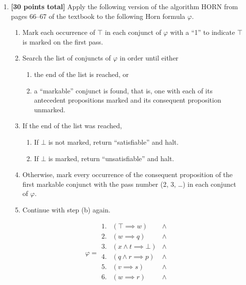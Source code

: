 \documentclass{article}
\begin{document}
\begin{enumerate}
  \vfill
  \begin{center}
    (continued overleaf)
  \end{center}
  \newpage
  
\item \textbf{[30 points total]} Apply the following version of the
  algorithm HORN from pages 66--67 of the textbook to the following
  Horn formula $\varphi$.
  \begin{enumerate}
  \item Mark each occurrence of $\top$ in each conjunct of $\varphi$
    with a ``1'' to indicate $\top$ is marked on the first pass.
  \item Search the list of conjuncts of $\varphi$ in order until
    either
    \begin{enumerate}
    \item the end of the list is reached, or
    \item a ``markable'' conjunct is found, that is, one with each of
      its antecedent propositions marked and its consequent
      proposition unmarked.
    \end{enumerate}
  \item If the end of the list was reached,
    \begin{enumerate}
    \item If $\bot$ is not marked, return ``satisfiable'' and halt.
    \item If $\bot$ is marked, return ``unsatisfiable'' and halt.
    \end{enumerate}
  \item Otherwise, mark every occurrence of the consequent proposition
    of the first markable conjunct with the pass number (2, 3, \dots)
    in each conjunct of $\varphi$.
  \item Continue with step (b) again.
  \end{enumerate}
  \begin{displaymath}
    \varphi = 
    \begin{array}{|lll}
      1.  & (\top \implies w)                  & \land \\
      2.  & (w \implies q)                     & \land \\
      3.  & (x \land t \implies \bot)          & \land \\
      4.  & (q \land r \implies p)             & \land \\
      5.  & (v \implies s)                     & \land \\
      6.  & (w \implies r)                     & \land \\

\end{array}
\end{displaymath}
\end{enumerate}
\end{document}
